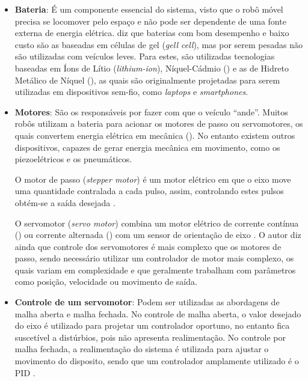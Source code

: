 \begin{itemize}

\item[] \textbf{Bateria}: É um componente essencial do sistema, visto que o robô móvel precisa se locomover pelo espaço e não pode 
ser dependente de uma fonte externa de energia elétrica.  diz que baterias com bom desempenho e baixo custo são 
as baseadas em células de gel (\textit{gell cell}), 
mas por serem pesadas não são utilizadas com veículos 
leves. Para estes, são utilizadas tecnologias baseadas em Íons de Lítio (\textit{lithium-ion}), 
Níquel-Cádmio () e as de Hidreto Metálico de Níquel (), as quais são 
originalmente projetadas para serem utilizadas em dispositivos sem-fio, como \textit{laptops} e \textit{smartphones}.

\item[] \textbf{Motores}: 
São os responsáveis por fazer com que o veículo \textquotedblleft ande\textquotedblright. 
Muitos robôs utilizam a bateria para acionar os motores de passo ou servomotores, os quais convertem energia 
elétrica em mecânica (). No entanto existem outros dispositivos, capazes de gerar energia mecânica em movimento, 
como os piezoelétricos e os pneumáticos.\par
O motor de passo (\textit{stepper motor}) é um motor elétrico em que o eixo move uma quantidade contralada a cada pulso, assim, 
controlando estes pulsos obtém-se a saída desejada \cite{dudek_mobile}.\par
O servomotor (\textit{servo motor}) combina um motor elétrico de corrente contínua 
() ou corrente alternada () com um sensor de orientação de eixo 
\cite{dudek_mobile}. 
O autor diz ainda que controle dos servomotores é mais complexo que os motores de passo, sendo necessário utilizar um controlador de 
motor mais complexo, os quais variam em complexidade e que geralmente trabalham com parâmetros como posição, velocidade ou 
movimento de saída.

\item[] \textbf{Controle de um servomotor}: Podem ser utilizadas as abordagens de malha aberta e malha fechada. No controle 
de malha aberta, o valor desejado do eixo é utilizado para projetar um controlador oportuno, no entanto fica 
suscetível a distúrbios, pois não apresenta realimentação. No controle por malha fechada, a realimentação do sistema é utilizada para 
ajustar o movimento do disposito, sendo que um controlador amplamente utilizado é o PID \cite{dudek_mobile}.


\end{itemize}
